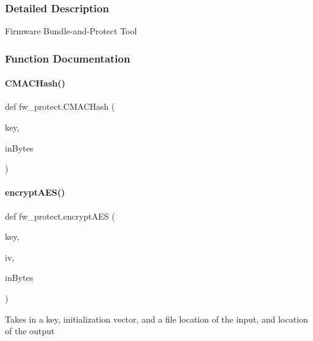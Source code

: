 \subsubsection{Detailed Description}
\begin{DoxyVerb}Firmware Bundle-and-Protect Tool\end{DoxyVerb}
 

\subsubsection{Function Documentation}
\mbox{\label{namespacefw__protect_a54f5aa6464f7083b24fed44f31279165}} 
\paragraph{\texorpdfstring{C\+M\+A\+C\+Hash()}{CMACHash()}}
{\footnotesize\ttfamily def fw\+\_\+protect.\+C\+M\+A\+C\+Hash (\begin{DoxyParamCaption}\item[{}]{key,  }\item[{}]{in\+Bytes }\end{DoxyParamCaption})}

\mbox{\label{namespacefw__protect_a4f6e6aec497cff38b557c332381cbabd}} 
\paragraph{\texorpdfstring{encrypt\+A\+E\+S()}{encryptAES()}}
{\footnotesize\ttfamily def fw\+\_\+protect.\+encrypt\+A\+ES (\begin{DoxyParamCaption}\item[{}]{key,  }\item[{}]{iv,  }\item[{}]{in\+Bytes }\end{DoxyParamCaption})}

\begin{DoxyVerb}Takes in a key, initialization vector, and a file location of the     input, and location of the output\end{DoxyVerb}
 \mbox{\label{namespacefw__protect_a9930b517bb3d82347a839b7bacac3316}} 
